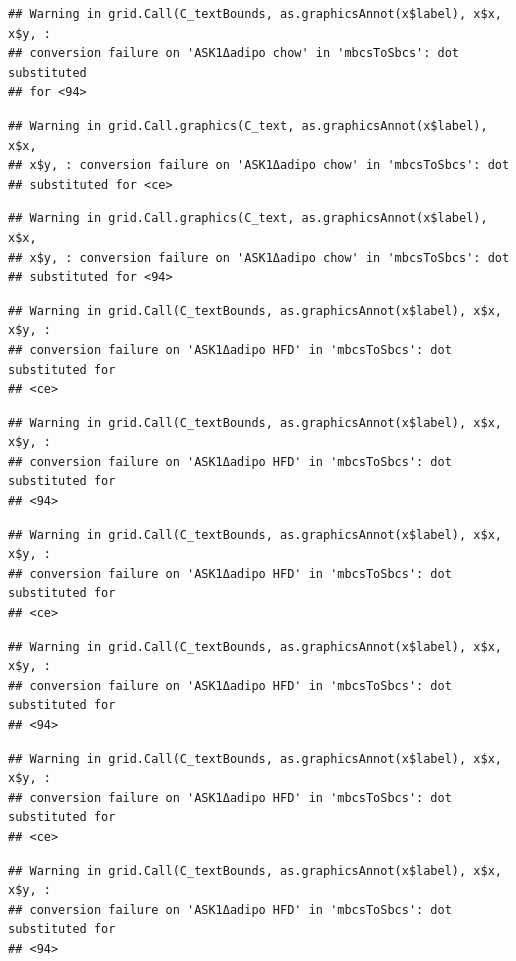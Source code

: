 \documentclass[]{book}
\begin{document}
\begin{verbatim}
## Warning in grid.Call(C_textBounds, as.graphicsAnnot(x$label), x$x, x$y, :
## conversion failure on 'ASK1Δadipo chow' in 'mbcsToSbcs': dot substituted
## for <94>
\end{verbatim}

\begin{verbatim}
## Warning in grid.Call.graphics(C_text, as.graphicsAnnot(x$label), x$x,
## x$y, : conversion failure on 'ASK1Δadipo chow' in 'mbcsToSbcs': dot
## substituted for <ce>
\end{verbatim}

\begin{verbatim}
## Warning in grid.Call.graphics(C_text, as.graphicsAnnot(x$label), x$x,
## x$y, : conversion failure on 'ASK1Δadipo chow' in 'mbcsToSbcs': dot
## substituted for <94>
\end{verbatim}

\begin{verbatim}
## Warning in grid.Call(C_textBounds, as.graphicsAnnot(x$label), x$x, x$y, :
## conversion failure on 'ASK1Δadipo HFD' in 'mbcsToSbcs': dot substituted for
## <ce>
\end{verbatim}

\begin{verbatim}
## Warning in grid.Call(C_textBounds, as.graphicsAnnot(x$label), x$x, x$y, :
## conversion failure on 'ASK1Δadipo HFD' in 'mbcsToSbcs': dot substituted for
## <94>
\end{verbatim}

\begin{verbatim}
## Warning in grid.Call(C_textBounds, as.graphicsAnnot(x$label), x$x, x$y, :
## conversion failure on 'ASK1Δadipo HFD' in 'mbcsToSbcs': dot substituted for
## <ce>
\end{verbatim}

\begin{verbatim}
## Warning in grid.Call(C_textBounds, as.graphicsAnnot(x$label), x$x, x$y, :
## conversion failure on 'ASK1Δadipo HFD' in 'mbcsToSbcs': dot substituted for
## <94>
\end{verbatim}

\begin{verbatim}
## Warning in grid.Call(C_textBounds, as.graphicsAnnot(x$label), x$x, x$y, :
## conversion failure on 'ASK1Δadipo HFD' in 'mbcsToSbcs': dot substituted for
## <ce>
\end{verbatim}

\begin{verbatim}
## Warning in grid.Call(C_textBounds, as.graphicsAnnot(x$label), x$x, x$y, :
## conversion failure on 'ASK1Δadipo HFD' in 'mbcsToSbcs': dot substituted for
## <94>
\end{verbatim}
\end{document}
